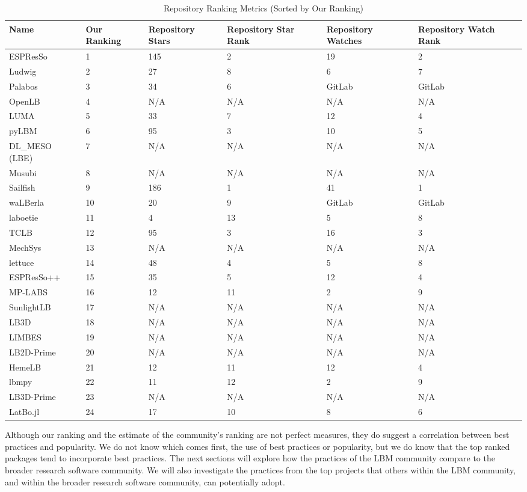 \documentclass[final, 3p, times, authoryear]{elsarticle}
\begin{document}
\begin{table}[ht!]
	\begin{center}
		\begin{tabular}{ p{3cm}p{1.25cm}p{1.75cm}p{1.75cm}p{1.75cm}p{1.75cm} }
			\toprule
			Name & Our Ranking & Repository Stars & Repository Star Rank &
			Repository Watches & Repository Watch Rank\\
			\midrule
			ESPResSo & 1 & 145 & 2 & 19& 2\\
			Ludwig & 2 & 27 & 8 & 6& 7\\
			Palabos & 3 & 34 & 6 & GitLab& GitLab\\
			OpenLB & 4 & N/A & N/A & N/A& N/A\\
			LUMA & 5 & 33 & 7 & 12& 4\\
			pyLBM & 6 & 95 & 3 & 10& 5\\
			DL\_MESO (LBE) & 7 & N/A & N/A & N/A & N/A\\
			Musubi & 8 & N/A & N/A & N/A & N/A\\
			Sailfish & 9 & 186 & 1 & 41& 1\\
			waLBerla & 10 & 20 & 9 & GitLab& GitLab\\
			laboetie & 11 & 4 & 13 & 5& 8\\
			TCLB & 12 & 95 & 3 & 16& 3\\
			MechSys & 13 & N/A & N/A & N/A& N/A\\
			lettuce & 14 & 48 & 4 & 5& 8\\
			ESPResSo++ & 15 & 35 & 5 & 12& 4\\
			MP-LABS & 16 & 12 & 11 & 2& 9\\			
			SunlightLB & 17 & N/A & N/A & N/A& N/A\\
			LB3D & 18 & N/A & N/A & N/A& N/A\\			
			LIMBES & 19 & N/A & N/A & N/A& N/A\\
			LB2D-Prime & 20 & N/A & N/A & N/A& N/A\\		
			HemeLB & 21 & 12 & 11 & 12& 4\\
			lbmpy & 22 &  11 & 12 & 2& 9\\	
			LB3D-Prime & 23 & N/A & N/A & N/A& N/A\\	
			LatBo.jl & 24 & 17 & 10 & 8& 6\\			
			\bottomrule
		\end{tabular}
		\caption{Repository Ranking Metrics (Sorted by Our Ranking)} \label{repometrics}
	\end{center}
\end{table}

Although our ranking and the estimate of the community's ranking are not perfect
measures, they do suggest a correlation between best practices and popularity.
We do not know which comes first, the use of best practices or popularity, but
we do know that the top ranked packages tend to incorporate best practices.  The
next sections will explore how the practices of the LBM community compare to the
broader research software community.  We will also investigate the practices
from the top projects that others within the LBM community, and within the
broader research software community, can potentially adopt.
\end{document}
